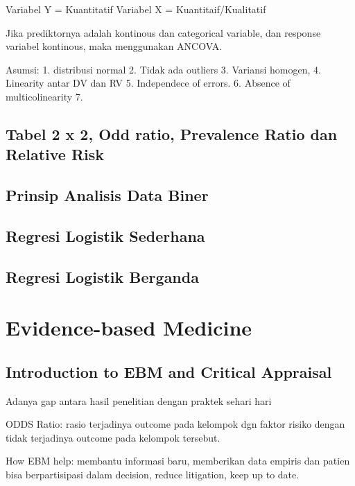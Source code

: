 \documentclass[
  letterpaper,
  DIV=11,
  numbers=noendperiod]{scrreprt}
\begin{document}
Variabel Y = Kuantitatif Variabel X = Kuantitaif/Kualitatif

Jika prediktornya adalah kontinous dan categorical variable, dan
response variabel kontinous, maka menggunakan ANCOVA.

Asumsi: 1. distribusi normal 2. Tidak ada outliers 3. Variansi homogen,
4. Linearity antar DV dan RV 5. Independece of errors. 6. Absence of
multicolinearity 7.

\section{Tabel 2 x 2, Odd ratio, Prevalence Ratio dan Relative
Risk}\label{tabel-2-x-2-odd-ratio-prevalence-ratio-dan-relative-risk}

\section{Prinsip Analisis Data Biner}\label{prinsip-analisis-data-biner}

\section{Regresi Logistik Sederhana}\label{regresi-logistik-sederhana}

\section{Regresi Logistik Berganda}\label{regresi-logistik-berganda}

\chapter{Evidence-based Medicine}\label{evidence-based-medicine}

\section{Introduction to EBM and Critical
Appraisal}\label{introduction-to-ebm-and-critical-appraisal}

Adanya gap antara hasil penelitian dengan praktek sehari hari

ODDS Ratio: rasio terjadinya outcome pada kelompok dgn faktor risiko
dengan tidak terjadinya outcome pada kelompok tersebut.

How EBM help: membantu informasi baru, memberikan data empiris dan
patien bisa berpartisipasi dalam decision, reduce litigation, keep up to
date.
\end{document}
